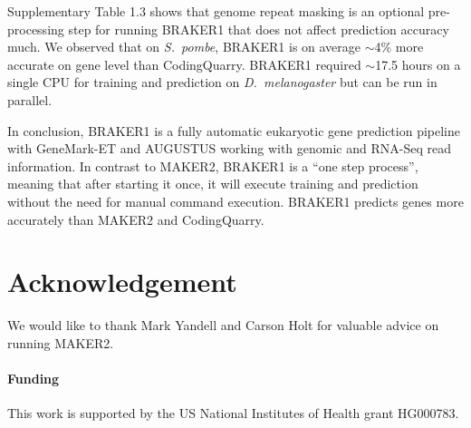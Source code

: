 \documentclass{bioinfo}
\begin{document}
Supplementary Table 1.3 shows that genome repeat masking is an optional pre-processing step for running BRAKER1 that does not affect prediction accuracy much. We observed that on \textit{S.~pombe}, BRAKER1 is on average $\sim$4\% more accurate on gene level than CodingQuarry. %
BRAKER1 required $\sim$17.5 hours on a single CPU for training and prediction on \textit{D.~melanogaster} but can be run in parallel.

In conclusion, BRAKER1 is a fully automatic eukaryotic gene prediction pipeline with GeneMark-ET and AUGUSTUS working with genomic and RNA-Seq read information. In contrast to MAKER2, BRAKER1 is a ``one step process'', meaning that after starting it once, it will execute training and prediction without the need for manual command execution. BRAKER1 predicts genes more accurately than MAKER2 and CodingQuarry.

\section*{Acknowledgement}

We would like to thank Mark Yandell and Carson Holt for valuable advice on running MAKER2.

\paragraph{Funding\textcolon} This work is supported by the US National Institutes of Health grant HG000783.

%
%
%
%
%
%
%
%
%
\end{document}
